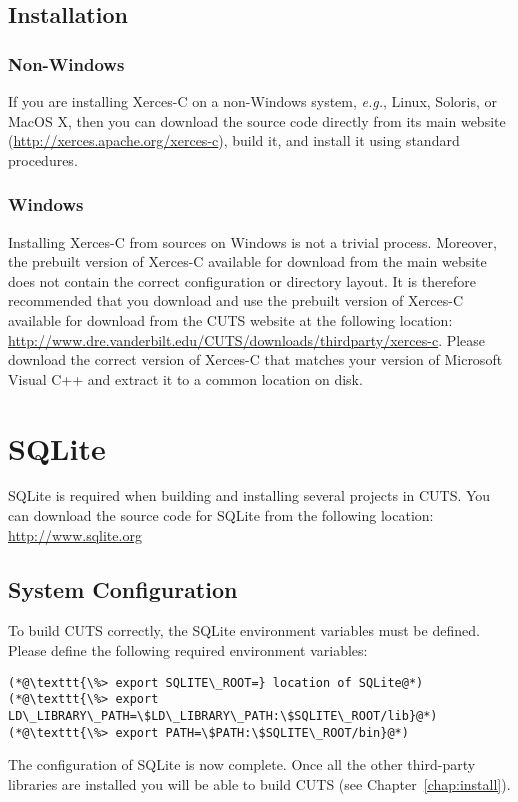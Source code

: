 \subsection{Installation}

\subsubsection{Non-Windows}
 
If you are installing Xerces-C on a non-Windows system, \textit{e.g.}, Linux, 
Soloris, or MacOS X, then you can download the source code directly from its
main website (\url{http://xerces.apache.org/xerces-c}), build it, and install it using 
standard procedures.

\subsubsection{Windows}

Installing Xerces-C from sources on Windows is not a trivial process. 
Moreover, the prebuilt version of Xerces-C available for download from 
the main website does not contain the correct configuration or directory
layout. It is therefore recommended that you download and use the prebuilt 
version of Xerces-C available for download from the CUTS website at the 
following location:
\url{http://www.dre.vanderbilt.edu/CUTS/downloads/thirdparty/xerces-c}. Please download
the correct version of Xerces-C that matches your version of Microsoft Visual
C++ and extract it to a common location on disk.

\section{SQLite}
\label{sec:thirdparty-sqlite}

SQLite is required when building and installing several 
projects in CUTS. You can download the source code for SQLite
from the following location: \url{http://www.sqlite.org}

\subsection{System Configuration}

To build CUTS correctly, the SQLite environment variables must be defined. Please 
define the following required environment variables:
\begin{lstlisting}
(*@\texttt{\%> export SQLITE\_ROOT=} location of SQLite@*)
(*@\texttt{\%> export LD\_LIBRARY\_PATH=\$LD\_LIBRARY\_PATH:\$SQLITE\_ROOT/lib}@*)
(*@\texttt{\%> export PATH=\$PATH:\$SQLITE\_ROOT/bin}@*)
\end{lstlisting}
The configuration of SQLite is now complete. Once all the other
third-party libraries are installed you will be able to build CUTS
(see Chapter~\ref{chap:install}).

